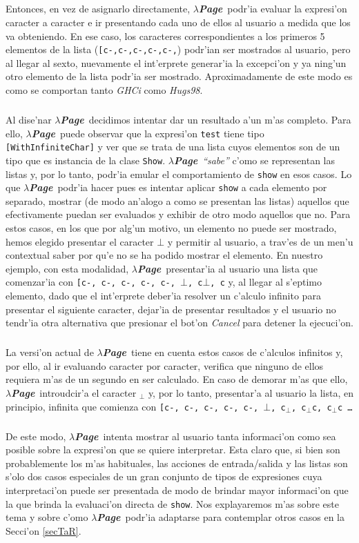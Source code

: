 \documentclass[a4paper]{article}
\newcommand{\hpage}{\textbf{\textsl{$\lambda$Page}}}
\begin{document}
\subparagraph{}Entonces, en vez de asignarlo directamente, \hpage\ podr'ia evaluar la expresi'on caracter a caracter e ir presentando cada uno de ellos al usuario a medida que los va obteniendo.  En ese caso, los caracteres correspondientes a los primeros 5 elementos de la lista (\texttt{[c-,c-,c-,c-,c-,}) podr'ian ser mostrados al usuario, pero al llegar al sexto, nuevamente el int'erprete generar'ia la excepci'on y ya ning'un otro elemento de la lista podr'ia ser mostrado.  Aproximadamente de este modo es como se comportan tanto \textsl{GHCi} como \textsl{Hugs98}.
\subparagraph{}Al dise'nar \hpage\ decidimos intentar dar un resultado a'un m'as completo.  Para ello, \hpage\ puede observar que la expresi'on \texttt{test} tiene tipo \texttt{[WithInfiniteChar]} y ver que se trata de una lista cuyos elementos son de un tipo que es instancia de la clase \texttt{Show}.  \hpage\ \textsl{``sabe''} c'omo se representan las listas y, por lo tanto, podr'ia emular el comportamiento de \texttt{show} en esos casos.  Lo que \hpage\ podr'ia hacer pues es intentar aplicar \texttt{show} a cada elemento por separado, mostrar (de modo an'alogo a como se presentan las listas) aquellos que efectivamente puedan ser evaluados y exhibir de otro modo aquellos que no.  Para estos casos, en los que por alg'un motivo, un elemento no puede ser mostrado, hemos elegido presentar el caracter $\bot$ y permitir al usuario, a trav'es de un men'u contextual saber por qu'e no se ha podido mostrar el elemento.  En nuestro ejemplo, con esta modalidad, \hpage\ presentar'ia al usuario una lista que comenzar'ia con \texttt{[c-, c-, c-, c-, c-, $\bot$, c$\bot$, c} y, al llegar al s'eptimo elemento, dado que el int'erprete deber'ia resolver un c'alculo infinito para presentar el siguiente caracter, dejar'ia de presentar resultados y el usuario no tendr'ia otra alternativa que presionar el bot'on \textsl{Cancel} para detener la ejecuci'on.
\subparagraph{}La versi'on actual de \hpage\ tiene en cuenta estos casos de c'alculos infinitos y, por ello, al ir evaluando caracter por caracter, verifica que ninguno de ellos requiera m'as de un segundo en ser calculado.  En caso de demorar m'as que ello, \hpage\ introudcir'a el caracter  $_{\bot}$ y, por lo tanto, presentar'a al usuario la lista, en principio, infinita que comienza con \texttt{[c-, c-, c-, c-, c-, $\bot$, c$_{\bot}$, c$_{\bot}$c, c$_{\bot}$c \ldots}
\subparagraph{}De este modo, \hpage\ intenta mostrar al usuario tanta informaci'on como sea posible sobre la expresi'on que se quiere interpretar.  Esta claro que, si bien son probablemente los m'as habituales, las acciones de entrada/salida y las listas son s'olo dos casos especiales de un gran conjunto de tipos de expresiones cuya interpretaci'on puede ser presentada de modo de brindar mayor informaci'on que la que brinda la evaluaci'on directa de \texttt{show}.  Nos explayaremos m'as sobre este tema y sobre c'omo \hpage\ podr'ia adaptarse para contemplar otros casos en la Secci'on \ref{secTaR}.
\end{document}
